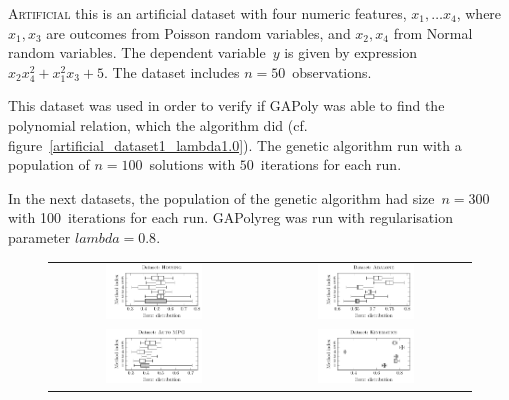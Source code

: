 \documentclass[preprint,authoryear,12pt]{elsarticle}
\begin{document}
\begin{description}
\item{\textsc{Artificial}} this is an artificial dataset with four numeric features, $x_1, \ldots x_4$, where $x_1,x_3$ are outcomes from Poisson random variables, and $x_2,x_4$ from Normal random variables. The dependent variable~$y$ is given by expression $x_2x_4^2 + x_1^2x_3 + 5$. The dataset includes $n=50$~observations.

This dataset was used in order to verify if \ac{GAPoly} was able to find the polynomial relation, which the algorithm did (cf. figure~\ref{artificial_dataset1_lambda1.0}). The genetic algorithm run with a population of $n=100$~solutions with $50$~iterations for each run.

In the next datasets, the population of the genetic algorithm had size~$n=300$ with 100~iterations for each run. \ac{GAPolyreg} was run with regularisation parameter $lambda = 0.8$.

\begin{figure}[tb]\begin{center}
\begin{tabular}{cc}
\includegraphics[width=0.48\textwidth]{figure_3a.pdf}
%
&
%
\includegraphics[width=0.48\textwidth]{figure_3b.pdf}
%
\\
%
\includegraphics[width=0.48\textwidth]{figure_3c.pdf}
%
&
%
\includegraphics[width=0.48\textwidth]{figure_3d.pdf}
%
\end{tabular}


\end{center}
\end{figure}
\end{description}
\end{document}

